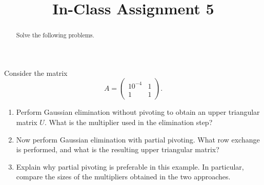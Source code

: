 \documentclass{ximera}
\begin{document}
    \title{In-Class Assignment 5}
    
    \begin{abstract} Solve the following problems.
    \end{abstract}
    \maketitle


\begin{exercise}
Consider the matrix
\[
A = \begin{pmatrix}
10^{-4} & 1\\
1 & 1
\end{pmatrix}.
\]

\begin{enumerate}
    \item Perform Gaussian elimination without pivoting to obtain an upper triangular matrix $U$. What is the multiplier used in the elimination step?

    \item Now perform Gaussian elimination with partial pivoting. What row exchange is performed, and what is the resulting upper triangular matrix?

    \item Explain why partial pivoting is preferable in this example. In particular, compare the sizes of the multipliers obtained in the two approaches.
\end{enumerate}
\end{exercise}
\end{document}
